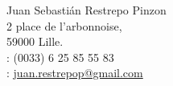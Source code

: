 \documentclass[10pt]{article}
\begin{document}
\pagestyle{empty}

\noindent Juan Sebasti\'an Restrepo Pinzon\\
2 place de l'arbonnoise,\\
59000 Lille.\\
\Mobilefone : (0033) 6 25 85 55 83\\
\Email: \url{juan.restrepop@gmail.com
}\\

\end{document}
